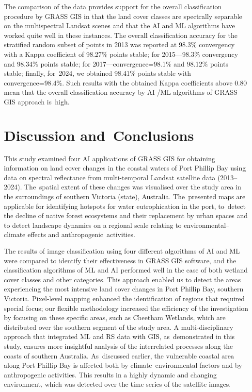 \documentclass[jmse,article,accept,pdftex,oneauthor]{Definitions/mdpi}
\begin{document}
{The comparison of the data provides support for the overall classification procedure by GRASS GIS  in that the land cover classes are spectrally separable on the multispectral Landsat scenes and that the AI and ML algorithms have worked quite well in these instances.} The overall classification accuracy for the stratified random subset of points in 2013 was reported at 98.3\% convergency with a Kappa coefficient of 98.27\% points stable; for 2015---98.3\% convergency and 98.34\% points stable; for 2017---convergence=98.1\% and 98.12\% points stable; finally, for~2024, we obtained 98.41\% points stable with convergence=98.4\%. Such results with the obtained Kappa coefficients above 0.80 mean that the overall classification accuracy by AI /ML algorithms of GRASS GIS approach is~high.

\section{Discussion and~Conclusions}

This study examined four AI applications of GRASS GIS for obtaining information on land cover changes in the coastal waters of Port Phillip Bay using data on spectral reflectance from multi-temporal Landsat satellite data (2013--2024). The~spatial extent of these changes was visualised over the study area in the surroundings of southern Victoria (state), Australia. The~presented maps are applicable for identifying hotspots for water eutrophication in the port, to~detect the decline of native forest ecosystems and their replacement by urban spaces and to detect landscape dynamics on a regional scale relating to environmental--climate effects and anthropogenic~activities. 

The results of image classification using four different algorithms of AI and ML were compared to identify their effectiveness in GRASS GIS software, {and the classification algorithms of ML and AI performed well in the case of both wetland cover classes and other categories.} This approach enabled us to detect the areas experiencing the most intensive land cover changes in Port Phillip Bay, southern Victoria. %
Pixel-level mapping enhanced the identification of regions that required special focus; our flexible methodology increased the efficiency of the investigation by focusing on these specific areas, such as Cheetham Wetlands, which are distributed over the southern segment of the study area. %
{A multi-disciplinary approach that integrated ML and RS data with GIS, as~demonstrated in this study, ensures more insightful analysis of the interrelated processes along the coasts of southern Australia. As~discussed earlier, the vulnerable coastal area along Port Phillip Bay is affected both by climate--environmental factors and by anthropogenic activities. This results in a highly dynamic and changing environment, which was detected over the time series of the satellite images. }
\end{document}
